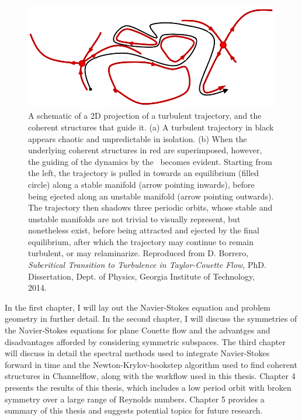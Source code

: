 \begin{figure}[h]
\centerline{
\includegraphics[width=\textwidth]{Figs/phaseSpaceTraj.pdf}}
\caption{A schematic of a 2D projection of a turbulent trajectory, and the coherent structures that guide it. (a) A turbulent trajectory in black appears chaotic and unpredictable in isolation. (b) When the underlying coherent structures in red are superimposed, however, the guiding of the dynamics by the \ecs\ becomes evident. Starting from the left, the trajectory is pulled in towards an equilibrium (filled circle) along a stable manifold (arrow pointing inwards), before being ejected along an unstable manifold (arrow pointing outwards). The trajectory then shadows three periodic orbits, whose stable and unstable manifolds are not trivial to visually represent, but nonetheless exist, before being attracted and ejected by the final equilibrium, after which the trajectory may continue to remain turbulent, or may relaminarize. Reproduced from D. Borrero, \emph{Subcritical Transition to Turbulence in Taylor-Couette Flow}, PhD. Dissertation, Dept. of Physics, Georgia Institute of Technology, 2014.}\label{fig:guidedTurbulence}
\end{figure}
In the first chapter, I will lay out the Navier-Stokes equation and problem geometry  in further detail. In the second chapter, I will discuss the symmetries of the Navier-Stokes equations for plane Couette flow and the advantges and disadvantages afforded by considering symmetric subspaces. The third chapter will discuss in detail the spectral methods used to integrate Navier-Stokes forward in time and the Newton-Krylov-hookstep algorithm used to find coherent structures in Channelflow, along with the workflow used in this thesis. Chapter 4 presents the results of this thesis, which includes a low period orbit with broken symmetry over a large range of Reynolds numbers. Chapter 5 provides a summary of this thesis and suggests potential topics for future research. 
 
 
 
 
 